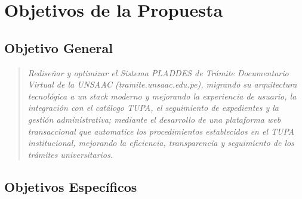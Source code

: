 \section{Objetivos de la Propuesta}
 
\subsection{Objetivo General}
 
\begin{quote}
\textit{Rediseñar y optimizar el Sistema PLADDES de Trámite Documentario Virtual de la UNSAAC (\textit{tramite.unsaac.edu.pe}), migrando su arquitectura tecnológica a un stack moderno y mejorando la experiencia de usuario, la integración con el catálogo TUPA, el seguimiento de expedientes y la gestión administrativa; mediante el desarrollo de una plataforma web transaccional que automatice los procedimientos establecidos en el TUPA institucional, mejorando la eficiencia, transparencia y seguimiento de los trámites universitarios.}
\end{quote}
 
\subsection{Objetivos Específicos}
 

